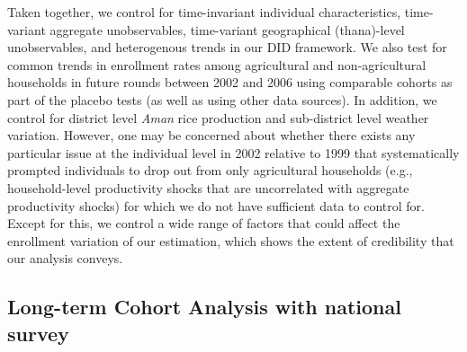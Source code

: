 \documentclass[12pt,letterpaper]{article}
\newcommand{\0}{\ensuremath{\mbox{\boldmath $0$}}}
\begin{document}
Taken together, we control for time-invariant individual characteristics, time-variant aggregate unobservables, time-variant geographical (thana)-level unobservables, and heterogenous trends in our DID framework. We also test for common trends in enrollment rates among agricultural and non-agricultural households in future rounds between 2002 and 2006 using comparable cohorts as part of the placebo tests (as well as using other data sources). In addition, we control for district level \textit{Aman} rice production and sub-district level weather variation. However, one may be concerned about whether there exists any particular issue at the individual level in 2002 relative to 1999 that systematically prompted individuals to drop out from only agricultural households (e.g., household-level productivity shocks that are uncorrelated with aggregate productivity shocks) for which we do not have sufficient data to control for. Except for this, we control a wide range of factors that could affect the enrollment variation of our estimation, which shows the extent of credibility that our analysis conveys.

\subsection{Long-term Cohort Analysis with national survey}
\end{document}
